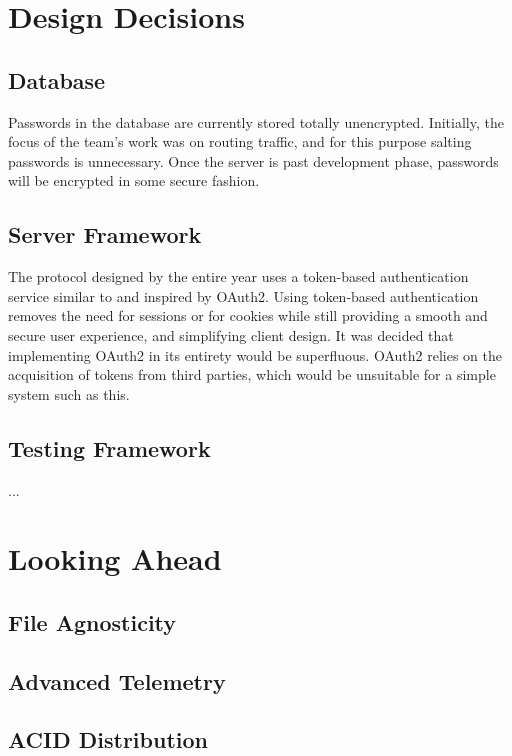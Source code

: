 \documentclass{article}
\begin{document}
\section{Design Decisions}
\subsection{Database}
Passwords in the database are currently stored totally unencrypted. Initially,
the focus of the team's work was on routing traffic, and for this purpose salting
passwords is unnecessary. Once the server is past development phase, passwords
will be encrypted in some secure fashion.

\subsection{Server Framework}
The protocol designed by the entire year uses a token-based authentication service
similar to and inspired by OAuth2. Using token-based authentication removes the need
for sessions or for cookies while still providing a smooth and secure user experience,
and simplifying client design.
It was decided that implementing OAuth2 in its entirety would be superfluous. OAuth2
relies on the acquisition of tokens from third parties, which would be unsuitable for
a simple system such as this.

\subsection{Testing Framework}
...

\section{Looking Ahead}
\subsection{File Agnosticity}

\subsection{Advanced Telemetry}

\subsection{ACID Distribution}
\end{document}
